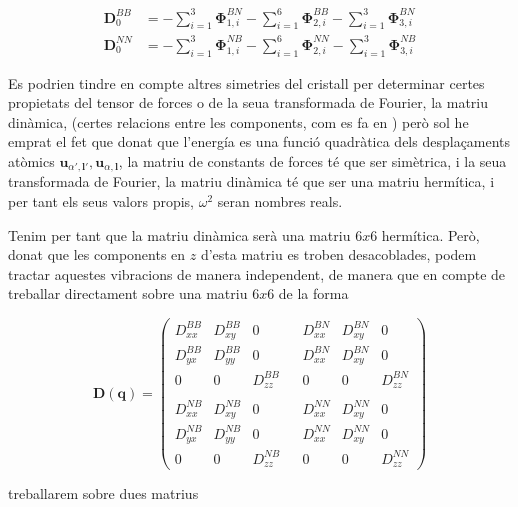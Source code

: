 \documentclass[12pt]{article} %
\let\vec\mathbf %
\begin{document}
\begin{equation}\begin{split}
\vec D_0^{BB}&=-\sum_{i=1}^3\vec \Phi_{1,i}^{BN}-\sum_{i=1}^6\vec \Phi_{2,i}^{BB}-\sum_{i=1}^3\vec \Phi_{3,i}^{BN} \\
\vec D_0^{NN}&=-\sum_{i=1}^3\vec \Phi_{1,i}^{NB}-\sum_{i=1}^6\vec \Phi_{2,i}^{NN}-\sum_{i=1}^3\vec \Phi_{3,i}^{NB}
\end{split}
\end{equation}


Es podrien tindre en compte altres simetries del cristall per determinar certes propietats del tensor de forces o de la seua transformada de Fourier, la matriu dinàmica, (certes relacions entre les components, com es fa en \cite{falkovsky08_symmet_const_phonon_disper_graph}) però sol he emprat el fet que donat que l'energía es una funció quadràtica dels desplaçaments atòmics $\vec u_{\alpha',\vec l'}, \vec u_{\alpha,\vec l}$, la matriu de constants de forces té que ser simètrica,  i la seua transformada de Fourier, la matriu dinàmica té que ser una matriu hermítica, i per tant els seus valors propis, $\omega^2$ seran nombres reals.


Tenim per tant que la matriu dinàmica serà una matriu $6x6$ hermítica. Però, donat que les components en $z$ d'esta matriu es troben desacoblades, podem tractar aquestes vibracions de manera independent, de manera que en compte de treballar directament sobre una matriu $6x6$ de la forma

\begin{equation}
  \vec D(\vec q)=
  \begin{pmatrix}
   D_{xx}^{BB} & D_{xy}^{BB} & 0 &              & D_{xx}^{BN} & D_{xy}^{BN} & 0 \\
   D_{yx}^{BB} & D_{yy}^{BB} & 0 &              & D_{xx}^{BN} & D_{xy}^{BN} & 0 \\
       0       &     0       & D_{zz}^{BB} &    & 0  & 0  & D_{zz}^{BN}        \\
    &  &  &  &  &  \\
   D_{xx}^{NB} & D_{xy}^{NB} & 0 &              & D_{xx}^{NN} & D_{xy}^{NN} & 0 \\
   D_{yx}^{NB} & D_{yy}^{NB} & 0 &              & D_{xx}^{NN} & D_{xy}^{NN} & 0 \\
       0       &     0       & D_{zz}^{NB} &    & 0  & 0  & D_{zz}^{NN} 
  \end{pmatrix}
\end{equation}

treballarem sobre dues matrius 
\end{document}
